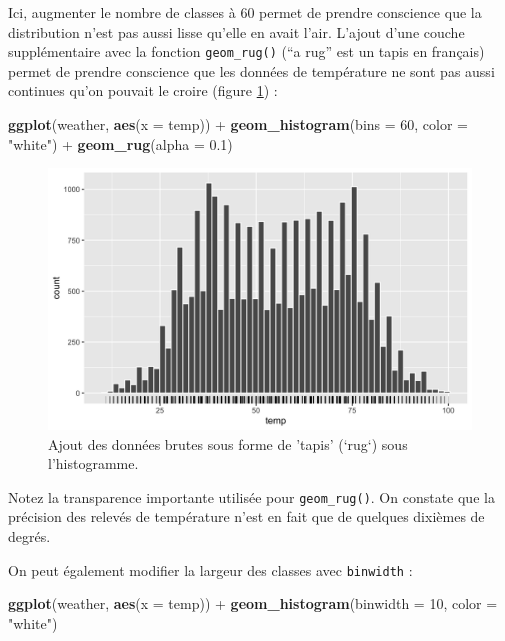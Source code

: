 \documentclass[
  a4paper,
]{article}
\newenvironment{Shaded}{\begin{snugshade}}{\end{snugshade}}
\newcommand{\DataTypeTok}[1]{\textcolor[rgb]{0.00,0.34,0.68}{#1}}
\newcommand{\DecValTok}[1]{\textcolor[rgb]{0.69,0.50,0.00}{#1}}
\newcommand{\FloatTok}[1]{\textcolor[rgb]{0.69,0.50,0.00}{#1}}
\newcommand{\KeywordTok}[1]{\textcolor[rgb]{0.12,0.11,0.11}{\textbf{#1}}}
\newcommand{\NormalTok}[1]{\textcolor[rgb]{0.12,0.11,0.11}{#1}}
\newcommand{\OperatorTok}[1]{\textcolor[rgb]{0.12,0.11,0.11}{#1}}
\newcommand{\StringTok}[1]{\textcolor[rgb]{0.75,0.01,0.01}{#1}}
\begin{document}
Ici, augmenter le nombre de classes à 60 permet de prendre conscience que la distribution n'est pas aussi lisse qu'elle en avait l'air. L'ajout d'une couche supplémentaire avec la fonction \texttt{geom\_rug()} (``a rug'' est un tapis en français) permet de prendre conscience que les données de température ne sont pas aussi continues qu'on pouvait le croire (figure \ref{fig:rughist}) :

\begin{Shaded}
\begin{Highlighting}[]
\KeywordTok{ggplot}\NormalTok{(weather, }\KeywordTok{aes}\NormalTok{(}\DataTypeTok{x =}\NormalTok{ temp)) }\OperatorTok{+}
\StringTok{  }\KeywordTok{geom_histogram}\NormalTok{(}\DataTypeTok{bins =} \DecValTok{60}\NormalTok{, }\DataTypeTok{color =} \StringTok{"white"}\NormalTok{) }\OperatorTok{+}
\StringTok{  }\KeywordTok{geom_rug}\NormalTok{(}\DataTypeTok{alpha =} \FloatTok{0.1}\NormalTok{)}
\end{Highlighting}
\end{Shaded}

\begin{figure}[htpb]

{\centering \includegraphics[width=0.9\linewidth]{figure/rughist-1} 

}

\caption{Ajout des données brutes sous forme de 'tapis' (`rug`) sous l'histogramme.}\label{fig:rughist}
\end{figure}

Notez la transparence importante utilisée pour \texttt{geom\_rug()}. On constate que la précision des relevés de température n'est en fait que de quelques dixièmes de degrés.

On peut également modifier la largeur des classes avec \texttt{binwidth} :

\begin{Shaded}
\begin{Highlighting}[]
\KeywordTok{ggplot}\NormalTok{(weather, }\KeywordTok{aes}\NormalTok{(}\DataTypeTok{x =}\NormalTok{ temp)) }\OperatorTok{+}
\StringTok{  }\KeywordTok{geom_histogram}\NormalTok{(}\DataTypeTok{binwidth =} \DecValTok{10}\NormalTok{, }\DataTypeTok{color =} \StringTok{"white"}\NormalTok{)}
\end{Highlighting}
\end{Shaded}
\end{document}
